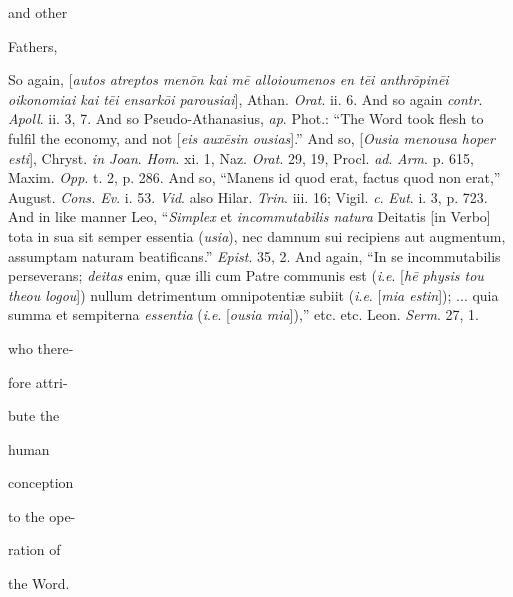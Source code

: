 and other

Fathers,

So again, [\emph{autos
atreptos men\={o}n kai m\={e} alloioumenos en t\={e}i
anthr\={o}pin\={e}i oikonomiai kai t\={e}i ensark\={o}i
parousiai}], Athan. \emph{Orat}. ii. 6. And so again \emph{contr}.
\emph{Apoll}. ii. 3, 7. And so Pseudo-Athanasius, \emph{ap}.
Phot.: ``The Word took flesh to fulfil the economy, and
not [\emph{eis aux\={e}sin ousias}].'' And so, [\emph{Ousia
menousa hoper esti}], Chryst. \emph{in Joan}. \emph{Hom}.
xi. 1, Naz. \emph{Orat}. 29, 19, Procl. \emph{ad}. \emph{Arm}.
p. 615, Maxim. \emph{Opp}. t. 2, p. 286. And so, ``Manens id
quod erat, factus quod non erat,'' August. \emph{Cons. Ev}. i.
53. \emph{Vid}. also Hilar. \emph{Trin}. iii. 16; Vigil. \emph{c}.
\emph{Eut}. i. 3, p. 723. And in like manner Leo, ``\emph{Simplex}
et \emph{incommutabilis natura} Deitatis [in Verbo] tota in
sua sit semper essentia (\emph{usia}), nec damnum sui
recipiens aut augmentum, assumptam naturam beatificans.'' \emph{Epist}.
35, 2. And again, ``In se incommutabilis perseverans; \emph{deitas}
enim, quæ illi cum Patre communis est (\emph{i}.\emph{e}. [\emph{h\={e}
physis tou theou logou}]) nullum detrimentum omnipotentiæ
subiit (\emph{i}.\emph{e}. [\emph{mia estin}]); ... quia summa
et sempiterna \emph{essentia} (\emph{i}.\emph{e}. [\emph{ousia
mia}]),'' etc. etc. Leon. \emph{Serm}. 27, 1.

who there-

fore attri-

bute the

human

conception

to the ope-

ration of

the Word.

